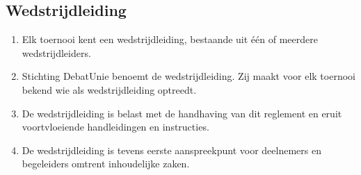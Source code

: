 \subsection{Wedstrijdleiding} \label{wedstrijdLeidingSubSection}

\begin{enumerate}
\item Elk toernooi kent een wedstrijdleiding, bestaande uit één of meerdere wedstrijdleiders.
\item Stichting DebatUnie benoemt de wedstrijdleiding. Zij maakt voor elk toernooi bekend wie als wedstrijdleiding optreedt.
\item De wedstrijdleiding is belast met de handhaving van dit reglement en eruit voortvloeiende handleidingen en instructies. 
\item De wedstrijdleiding is tevens eerste aanspreekpunt voor deelnemers en begeleiders omtrent inhoudelijke zaken.
\end{enumerate}
